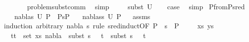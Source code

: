 \begin{isabellebody}
\ \ \ \ \ \isamarkupfalse%
\ problem{\isacharunderscore}{\kern0pt}subst{\isacharunderscore}{\kern0pt}comm\ \isamarkupfalse%
\ simp\isanewline
\isanewline
\ \ \ \isamarkupfalse%
\ subst\ U\isanewline
\ \ \isamarkupfalse%
\ {\isacharquery}{\kern0pt}case\ \isamarkupfalse%
\ simp\isanewline
{}\isamarkupfalse%
%
\endisatagproof
{\isafoldproof}%
%
\isadelimproof
\isanewline
%
\endisadelimproof
\isanewline
\isanewline
\isanewline
{}\isamarkupfalse%
\ P{}{\isacharunderscore}{\kern0pt}from{\isacharunderscore}{\kern0pt}P{}{\isacharunderscore}{\kern0pt}sred{\isacharcolon}{\kern0pt}\ \isanewline
\ \ \ {\isachardoublequoteopen}{\isacharparenleft}{\kern0pt}nabla{}{\isacharcomma}{\kern0pt}s{}{\isacharparenright}{\kern0pt}{\isasymin}\ U\ P{}{\isachardoublequoteclose}\ \ {\isachardoublequoteopen}P{}{\isasymturnstile}s{}{\isasymleadsto}P{}{\isachardoublequoteclose}\isanewline
\ \ \ {\isachardoublequoteopen}{\isacharparenleft}{\kern0pt}nabla{}{\isacharcomma}{\kern0pt}s{}{\isasymbullet}s{}{\isacharparenright}{\kern0pt}{\isasymin}\ U\ P{}{\isachardoublequoteclose}\isanewline
%
\isadelimproof
\ %
\endisadelimproof
%
\isatagproof
{}\isamarkupfalse%
\ assms\isanewline
{}\isamarkupfalse%
{\isacharparenleft}{\kern0pt}induction\ arbitrary{\isacharcolon}{\kern0pt}\ nabla{}\ s{}\ rule{\isacharcolon}{\kern0pt}\ s{\isacharunderscore}{\kern0pt}red{\isachardot}{\kern0pt}induct{\isacharbrackleft}{\kern0pt}OF\ {\isacartoucheopen}P{}\ {\isasymturnstile}\ s{}\ {\isasymleadsto}\ P{}{\isacartoucheclose}{\isacharbrackright}{\kern0pt}{\isacharparenright}{\kern0pt}\isanewline
\ \ \isamarkupfalse%
\ {\isacharparenleft}{\kern0pt}{}\ xs\ ys{\isacharparenright}{\kern0pt}\isanewline
\ \ \isamarkupfalse%
\ {\isachardoublequoteopen}{\isasymforall}\ {\isacharparenleft}{\kern0pt}t{}{\isacharcomma}{\kern0pt}t{}{\isacharparenright}{\kern0pt}\ {\isasymin}\ set\ xs{\isachardot}{\kern0pt}\ nabla{}\ {\isasymturnstile}\ subst\ {\isacharparenleft}{\kern0pt}s{}\ {\isasymbullet}\ {\isacharbrackleft}{\kern0pt}{\isacharbrackright}{\kern0pt}{\isacharparenright}{\kern0pt}\ t{}\ {\isasymapprox}\ subst\ {\isacharparenleft}{\kern0pt}s{}\ {\isasymbullet}\ {\isacharbrackleft}{\kern0pt}{\isacharbrackright}{\kern0pt}{\isacharparenright}{\kern0pt}\ t{}{\isachardoublequoteclose}\ \isanewline

\end{isabellebody}
